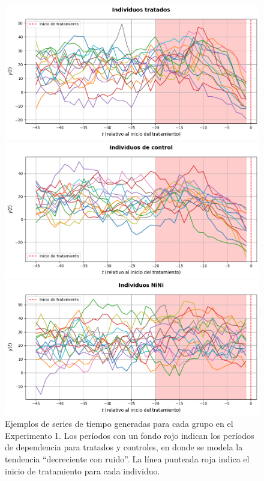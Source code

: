 \documentclass[../../main.tex]{subfiles}
\begin{document}
\begin{figure}[ht]
    \centering
    \begin{minipage}{0.48\textwidth}
        \centering
        \includegraphics[scale=0.3]{figs/Exp1/tratados_sim61.png}
    \end{minipage}
    \hfill
    \begin{minipage}{0.48\textwidth}
        \centering
        \includegraphics[scale=0.3]{figs/Exp1/controles_sim61.png}
    \end{minipage}
    \vspace{0.5em}
    \begin{minipage}{0.6\textwidth}
        \centering
        \includegraphics[scale=0.3]{figs/Exp1/ninis_sim61.png}
    \end{minipage}
    \caption{Ejemplos de series de tiempo generadas para cada grupo en el Experimento 1.
    Los períodos con un fondo rojo indican los períodos de dependencia para tratados y
    controles, en donde se modela la tendencia ``decreciente con ruido''. La línea
    punteada roja indica el inicio de tratamiento para cada individuo.}
    \label{fig:time_series_exp1}
\end{figure}
\end{document}
